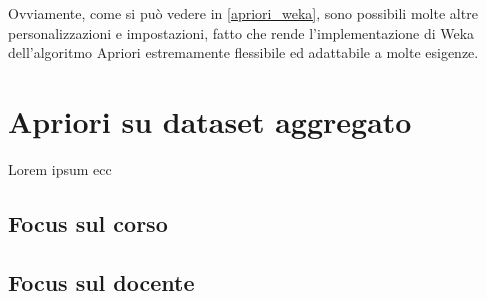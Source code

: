         Ovviamente, come si può vedere in \ref{apriori_weka}, sono possibili molte altre personalizzazioni e impostazioni, fatto che rende l'implementazione di Weka dell'algoritmo Apriori estremamente flessibile ed adattabile a molte esigenze.
 
\section{Apriori su dataset aggregato}

    Lorem ipsum ecc

        \subsection{Focus sul corso}

            

        \subsection{Focus sul docente}

            
